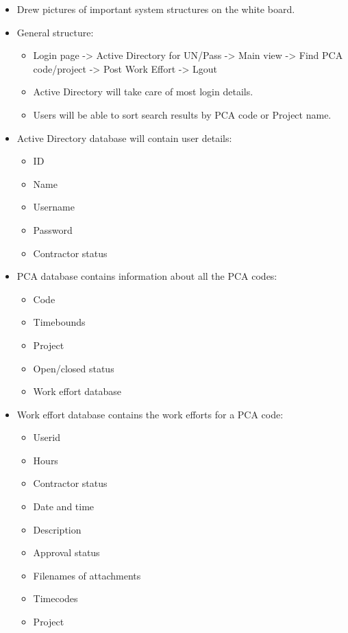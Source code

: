 \documentclass{article}
\begin{document}
\begin{itemize}
\item Drew pictures of important system structures on the white board.
\item General structure:
	\begin{itemize}
	\item Login page -> Active Directory for UN/Pass -> Main view -> Find PCA code/project -> Post Work Effort -> Lgout
	\item Active Directory will take care of most login details.
	\item Users will be able to sort search results by PCA code or Project name.
	\end{itemize}
\item Active Directory database will contain user details:
	\begin{itemize}
	\item ID
	\item Name
	\item Username
	\item Password
	\item Contractor status
	\end{itemize}
\item PCA database contains information about all the PCA codes:
	\begin{itemize}
	\item Code
	\item Timebounds
	\item Project
	\item Open/closed status
	\item Work effort database
	\end{itemize}
\item Work effort database contains the work efforts for a PCA code:
	\begin{itemize}
	\item Userid
	\item Hours
	\item Contractor status
	\item Date and time
	\item Description
	\item Approval status
	\item Filenames of attachments
	\item Timecodes
	\item Project
	\end{itemize}
\end{itemize}
\end{document}
